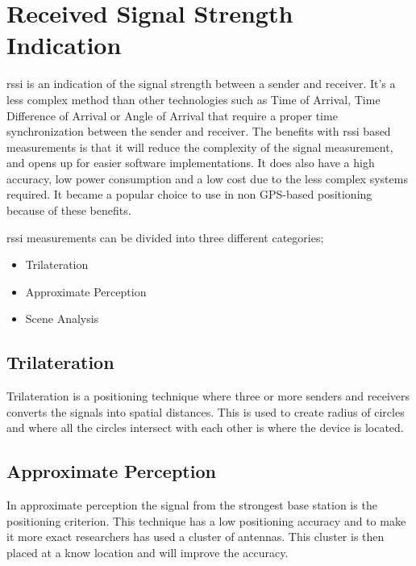 \section{Received Signal Strength Indication}\label{sec:theoryRssi}
\acrfull{rssi} is an indication of the signal strength between a sender and receiver.
It's a less complex method than other technologies such as Time of Arrival, Time Difference of Arrival or
Angle of Arrival that require a proper time synchronization between the sender and receiver.
The benefits with \acrshort{rssi} based measurements is that it will reduce the complexity of the signal measurement, and opens up for easier software implementations.
It does also have a high accuracy, low power consumption and a low cost due to the less complex systems required.
It became a popular choice to use in non GPS-based positioning because of these benefits.\cite{IndoorFingerprintPositioning2017} 

\bigskip

\acrshort{rssi} measurements can be divided into three different categories;

\begin{itemize}
	\item Trilateration
	\item Approximate Perception
	\item Scene Analysis \cite{IndoorFingerprintPositioning2017}
\end{itemize}

\subsection{Trilateration}\label{sec:theoryRssiTrilateration} Trilateration
is a positioning technique where three or more senders and receivers converts the signals
into spatial distances.  This is used to create radius of circles and where all
the circles intersect with each other is where the device is located.
\cite{IndoorFingerprintPositioning2017} 

\subsection{Approximate Perception}\label{sec:theoryRssiApproxPerception} In
approximate perception the signal from the strongest base station is the
positioning criterion.  This technique has a low positioning accuracy and to
make it more exact researchers has used a cluster of antennas.  This cluster is
then placed at a know location and will improve the
accuracy.\cite{IndoorFingerprintPositioning2017} 

